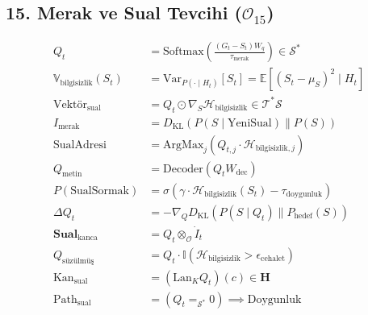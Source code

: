 \documentclass[11pt, a4paper]{article}
\begin{document}
\subsection{15. Merak ve Sual Tevcihi ($\mathcal{O}_{15}$)}
\begin{align}
Q_t &= \text{Softmax}\left( \frac{(G_t - S_t) W_q}{\tau_{\text{merak}}} \right) \in \mathcal{S}^* \\
\mathbb{V}_{\text{bilgisizlik}}(S_t) &= \text{Var}_{P(\cdot \mid H_t)}[S_t] = \mathbb{E}[(S_t - \mu_S)^2 \mid H_t] \\
\text{Vektör}_{\text{sual}} &= Q_t \odot \nabla_{S} \mathcal{H}_{\text{bilgisizlik}} \in \mathcal{T}^*\mathcal{S} \\
I_{\text{merak}} &= D_{\text{KL}}\left( P(S \mid \text{YeniSual}) \parallel P(S) \right) \\
\text{SualAdresi} &= \text{ArgMax}_{j} (Q_{t, j} \cdot \mathcal{H}_{\text{bilgisizlik}, j}) \\
Q_{\text{metin}} &= \text{Decoder}(Q_t W_{\text{dec}}) \\
P(\text{SualSormak}) &= \sigma(\gamma \cdot \mathcal{H}_{\text{bilgisizlik}}(S_t) - \tau_{\text{doygunluk}}) \\
\Delta Q_t &= -\nabla_Q D_{\text{KL}}(P(S \mid Q_t) \parallel P_{\text{hedef}}(S)) \\
\mathbf{Sual}_{\text{kanca}} &= Q_t \otimes_{\mathcal{O}} \dot{I}_t \\
Q_{\text{süzülmüş}} &= Q_t \cdot \mathbb{I}(\mathcal{H}_{\text{bilgisizlik}} > \epsilon_{\text{cehalet}}) \\
\text{Kan}_{\text{sual}} &= (\text{Lan}_K Q_t)(c) \in \mathbf{H} \\
\text{Path}_{\text{sual}} &= (Q_t =_{\mathcal{S}^*} 0) \implies \text{Doygunluk}
\end{align}
\end{document}
